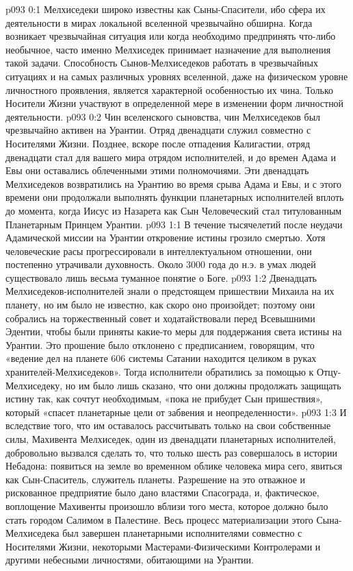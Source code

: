 \author{Мелхиседек}
\vs p093 0:1 Мелхиседеки широко известны как Сыны\hyp{}Спасители, ибо сфера их деятельности в мирах локальной вселенной чрезвычайно обширна. Когда возникает чрезвычайная ситуация или когда необходимо предпринять что\hyp{}либо необычное, часто именно Мелхиседек принимает назначение для выполнения такой задачи. Способность Сынов\hyp{}Мелхиседеков работать в чрезвычайных ситуациях и на самых различных уровнях вселенной, даже на физическом уровне личностного проявления, является характерной особенностью их чина. Только Носители Жизни участвуют в определенной мере в изменении форм личностной деятельности.
\vs p093 0:2 \pc Чин вселенского сыновства, чин Мелхиседеков был чрезвычайно активен на Урантии. Отряд двенадцати служил совместно с Носителями Жизни. Позднее, вскоре после отпадения Калигастии, отряд двенадцати стал для вашего мира отрядом исполнителей, и до времен Адама и Евы они оставались облеченными этими полномочиями. Эти двенадцать Мелхиседеков возвратились на Урантию во время срыва Адама и Евы, и с этого времени они продолжали выполнять функции планетарных исполнителей вплоть до момента, когда Иисус из Назарета как Сын Человеческий стал титулованным Планетарным Принцем Урантии.
\vs p093 1:1 В течение тысячелетий после неудачи Адамической миссии на Урантии откровение истины грозило смертью. Хотя человеческие расы прогрессировали в интеллектуальном отношении, они постепенно утрачивали духовность. Около 3000 года до н.э. в умах людей существовало лишь весьма туманное понятие о Боге.
\vs p093 1:2 Двенадцать Мелхиседеков\hyp{}исполнителей знали о предстоящем пришествии Михаила на их планету, но им было не известно, как скоро оно произойдет; поэтому они собрались на торжественный совет и ходатайствовали перед Всевышними Эдентии, чтобы были приняты какие\hyp{}то меры для поддержания света истины на Урантии. Это прошение было отклонено с предписанием, говорящим, что «ведение дел на планете 606 системы Сатании находится целиком в руках хранителей\hyp{}Мелхиседеков». Тогда исполнители обратились за помощью к Отцу\hyp{}Мелхиседеку, но им было лишь сказано, что они должны продолжать защищать истину так, как сочтут необходимым, «пока не прибудет Сын пришествия», который «спасет планетарные цели от забвения и неопределенности».
\vs p093 1:3 И вследствие того, что им оставалось рассчитывать только на свои собственные силы, Махивента Мелхиседек, один из двенадцати планетарных исполнителей, добровольно вызвался сделать то, что только шесть раз совершалось в истории Небадона: появиться на земле во временном облике человека мира сего, явиться как Сын\hyp{}Спаситель, служитель планеты. Разрешение на это отважное и рискованное предприятие было дано властями Спасограда, и, фактическое, воплощение Махивенты произошло вблизи того места, которое должно было стать городом Салимом в Палестине. Весь процесс материализации этого Сына\hyp{}Мелхиседека был завершен планетарными исполнителями совместно с Носителями Жизни, некоторыми Мастерами\hyp{}Физическими Контролерами и другими небесными личностями, обитающими на Урантии.
